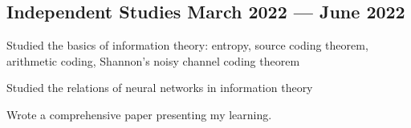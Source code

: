 \documentclass[a4paper,12pt]{article}
\begin{document}
\subsection{{Independent Studies  March 2022 --- June 2022}}
\vspace*{3pt}
\begin{zitemize}
\item Studied the basics of information theory: entropy, source coding theorem, arithmetic coding, Shannon's noisy channel coding theorem
\item Studied the relations of neural networks in information theory
\item Wrote a comprehensive paper presenting my learning.
\end{zitemize}





\end{document}
